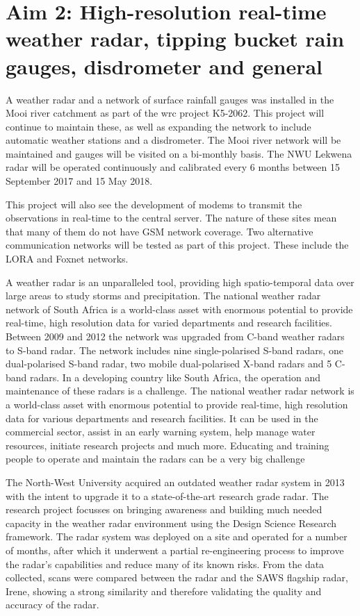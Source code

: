 \documentclass{wrcreport}
\begin{document}
\section{Aim 2: High-resolution real-time weather radar, tipping bucket rain gauges, disdrometer and general}

A weather radar and a network of surface rainfall gauges was installed
in the Mooi river catchment as part of the \gls{wrc} project K5-2062.
This project will continue to maintain these, as well as expanding the
network to include automatic weather stations and a disdrometer. The
Mooi river network will be maintained and gauges will be visited on a
bi-monthly basis. The NWU Lekwena radar will be operated continuously
and calibrated every 6 months between 15 September 2017 and 15 May
2018.

This project will also see the development of modems to transmit the
observations in real-time to the central server. The nature of these
sites mean that many of them do not have GSM network coverage. Two
alternative communication networks will be tested as part of this
project. These include the LORA and Foxnet networks.

A weather radar is an unparalleled tool, providing high
spatio-temporal data over large areas to study storms and
precipitation. The national weather radar network of South Africa is a
world-class asset with enormous potential to provide real-time, high
resolution data for varied departments and research facilities.
Between 2009 and 2012 the network was upgraded from C-band weather
radars to S-band radar. The network includes nine single-polarised
S-band radars, one dual-polarised S-band radar, two mobile
dual-polarised X-band radars and 5 C-band radars. In a developing
country like South Africa, the operation and maintenance of these
radars is a challenge. The national weather radar network is a
world-class asset with enormous potential to provide real-time, high
resolution data for various departments and research facilities. It
can be used in the commercial sector, assist in an early warning
system, help manage water resources, initiate research projects and
much more. Educating and training people to operate and maintain the
radars can be a very big challenge

The North-West University acquired an outdated weather radar system in
2013 with the intent to upgrade it to a state-of-the-art research
grade radar. The research project focusses on bringing awareness and
building much needed capacity in the weather radar environment using
the Design Science Research framework. The radar system was deployed
on a site and operated for a number of months, after which it
underwent a partial re-engineering process to improve the radar’s
capabilities and reduce many of its known risks. From the data
collected, scans were compared between the radar and the SAWS flagship
radar, Irene, showing a strong similarity and therefore validating the
quality and accuracy of the radar.
\end{document}
